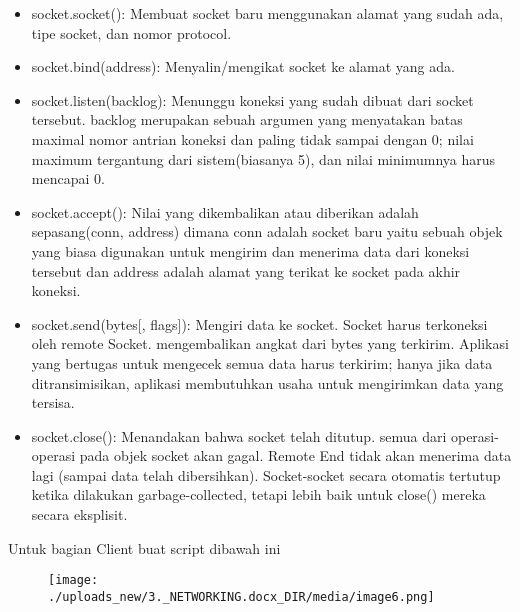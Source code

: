 \documentclass{wileySix}
\begin{document}
\begin{itemize}
	\item socket.socket(): Membuat socket baru menggunakan alamat yang sudah ada, tipe socket, dan nomor protocol. \par
	\noindent 
	\item socket.bind(address): Menyalin/mengikat socket ke alamat yang ada. \par
	\noindent 
	\item socket.listen(backlog): Menunggu koneksi yang sudah dibuat dari socket tersebut. backlog merupakan sebuah argumen yang menyatakan batas maximal nomor antrian koneksi dan paling tidak sampai dengan 0; nilai maximum tergantung dari sistem(biasanya 5), dan nilai minimumnya harus mencapai 0. \par
	\noindent 
	\item socket.accept(): Nilai yang dikembalikan atau diberikan adalah sepasang(conn, address) dimana conn adalah socket baru yaitu sebuah objek yang biasa digunakan untuk mengirim dan menerima data dari koneksi tersebut dan address adalah alamat yang terikat ke socket pada akhir koneksi. \par
	\noindent 
	\item socket.send(bytes[, flags]): Mengiri data ke socket. Socket harus terkoneksi oleh remote Socket. mengembalikan angkat dari bytes yang terkirim. Aplikasi yang bertugas untuk mengecek semua data harus terkirim; hanya jika data ditransimisikan, aplikasi membutuhkan usaha untuk mengirimkan data yang tersisa. \par
	\noindent 
	\item socket.close(): Menandakan bahwa socket telah ditutup. semua dari operasi-operasi pada objek socket akan gagal. Remote End tidak akan menerima data lagi (sampai data telah dibersihkan). Socket-socket secara otomatis tertutup ketika dilakukan garbage-collected, tetapi lebih baik untuk close() mereka secara eksplisit.\end{itemize}
\par
Untuk bagian Client buat script dibawah ini \par
\begin{center}
	
	
	
	\begin{figure}[H]
		\begin{center}
			\texttt{[image: ./uploads\_new/3.\_NETWORKING.docx\_DIR/media/image6.png]}
		\end{center}
	\end{figure}
	
	
	
	
\end{center}\vspace{12pt}
\end{document}
